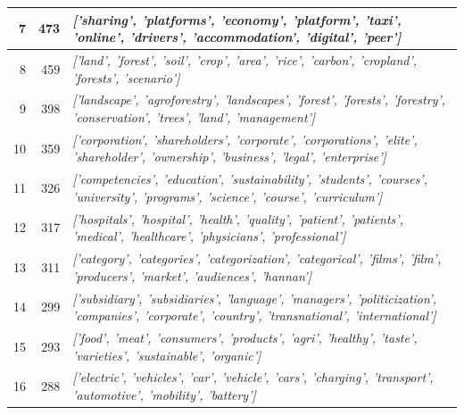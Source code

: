 \documentclass[12pt]{article}
\begin{document}
\begin{landscape}
\begin{table}[]
\begin{tabular}{|r|r|l|}
7                                    & 473                                 & \textit{{[}'sharing', 'platforms', 'economy', 'platform', 'taxi', 'online', 'drivers', 'accommodation', 'digital', 'peer'{]}}                                   \\ \hline
8                                    & 459                                 & \textit{{[}'land', 'forest', 'soil', 'crop', 'area', 'rice', 'carbon', 'cropland', 'forests', 'scenario'{]}}                                                    \\ \hline
9                                    & 398                                 & \textit{{[}'landscape', 'agroforestry', 'landscapes', 'forest', 'forests', 'forestry', 'conservation', 'trees', 'land', 'management'{]}}                        \\ \hline
10                                   & 359                                 & \textit{{[}'corporation', 'shareholders', 'corporate', 'corporations', 'elite', 'shareholder', 'ownership', 'business', 'legal', 'enterprise'{]}}               \\ \hline
11                                   & 326                                 & \textit{{[}'competencies', 'education', 'sustainability', 'students', 'courses', 'university', 'programs', 'science', 'course', 'curriculum'{]}}                \\ \hline
12                                   & 317                                 & \textit{{[}'hospitals', 'hospital', 'health', 'quality', 'patient', 'patients', 'medical', 'healthcare', 'physicians', 'professional'{]}}                       \\ \hline
13                                   & 311                                 & \textit{{[}'category', 'categories', 'categorization', 'categorical', 'films', 'film', 'producers', 'market', 'audiences', 'hannan'{]}}                         \\ \hline
14                                   & 299                                 & \textit{{[}'subsidiary', 'subsidiaries', 'language', 'managers', 'politicization', 'companies', 'corporate', 'country', 'transnational', 'international'{]}}    \\ \hline
15                                   & 293                                 & \textit{{[}'food', 'meat', 'consumers', 'products', 'agri', 'healthy', 'taste', 'varieties', 'sustainable', 'organic'{]}}                                       \\ \hline
16                                   & 288                                 & \textit{{[}'electric', 'vehicles', 'car', 'vehicle', 'cars', 'charging', 'transport', 'automotive', 'mobility', 'battery'{]}}                                   \\ \hline

\end{tabular}
\end{table}
\end{landscape}
\end{document}
